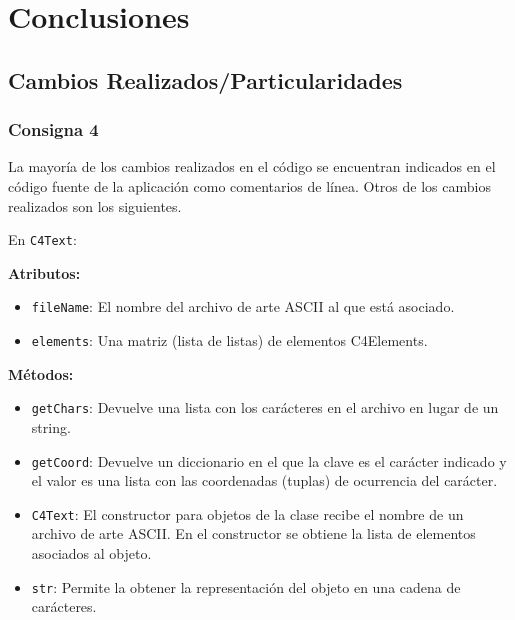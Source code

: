\documentclass[a4paper,12pt]{article}
\begin{document}
\section{Conclusiones}
\subsection{Cambios Realizados/Particularidades}
\subsubsection{Consigna 4}

La mayoría de los cambios realizados en el código se encuentran indicados en el código fuente de la aplicación como comentarios de línea. Otros de los cambios realizados son los siguientes.

En \texttt{C4Text}:

\textbf{Atributos:}
\begin{itemize}
  \item \texttt{fileName}: El nombre del archivo de arte ASCII al que está asociado.
  \item \texttt{elements}: Una matriz (lista de listas) de elementos C4Elements.
\end{itemize}

\textbf{Métodos:}
\begin{itemize}
  \item \texttt{getChars}: Devuelve una lista con los carácteres en el archivo en lugar de un string.
  \item \texttt{getCoord}: Devuelve un diccionario en el que la clave es el carácter indicado y el valor es una lista con las coordenadas (tuplas) de ocurrencia del carácter.
  \item \texttt{C4Text}: El constructor para objetos de la clase recibe el nombre de un archivo de arte ASCII. En el constructor se obtiene la lista de elementos asociados al objeto.
  \item\texttt{str}: Permite la obtener la representación del objeto en una cadena de carácteres.
\end{itemize}
\end{document}
